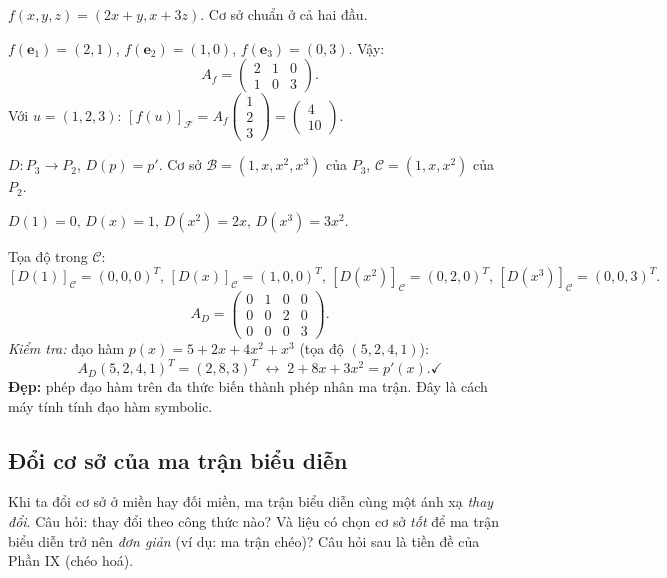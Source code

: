 \documentclass[12pt,a4paper]{article}
\begin{document}
\begin{vidu}[title={Áp dụng với $f: \mathbb{R}^3 \to \mathbb{R}^2$}]
$f(x, y, z) = (2x + y, x + 3z)$. Cơ sở chuẩn ở cả hai đầu.

$f(\mathbf{e}_1) = (2, 1)$, $f(\mathbf{e}_2) = (1, 0)$, $f(\mathbf{e}_3) = (0, 3)$. Vậy:
\[
  A_f = \begin{pmatrix}2 & 1 & 0\\ 1 & 0 & 3\end{pmatrix}.
\]
Với $u = (1, 2, 3)$: $[f(u)]_{\mathcal{F}} = A_f \begin{pmatrix}1\\2\\3\end{pmatrix} = \begin{pmatrix}4\\10\end{pmatrix}$.
\end{vidu}

\begin{vidu}[title={Đạo hàm trên đa thức -- ánh xạ tuyến tính trên KGVT phi-$\mathbb{R}^n$}]
$D: P_3 \to P_2$, $D(p) = p'$. Cơ sở $\mathcal{B} = (1, x, x^2, x^3)$ của $P_3$, $\mathcal{C} = (1, x, x^2)$ của $P_2$.

$D(1) = 0,\, D(x) = 1,\, D(x^2) = 2x,\, D(x^3) = 3x^2$.

Tọa độ trong $\mathcal{C}$:
\[
  [D(1)]_{\mathcal{C}} = (0,0,0)^T,\, [D(x)]_{\mathcal{C}} = (1,0,0)^T,\, [D(x^2)]_{\mathcal{C}} = (0,2,0)^T,\, [D(x^3)]_{\mathcal{C}} = (0,0,3)^T.
\]
\[
  A_D = \begin{pmatrix}0 & 1 & 0 & 0\\ 0 & 0 & 2 & 0\\ 0 & 0 & 0 & 3\end{pmatrix}.
\]
\emph{Kiểm tra:} đạo hàm $p(x) = 5 + 2x + 4x^2 + x^3$ (tọa độ $(5,2,4,1)$):
\[
  A_D (5,2,4,1)^T = (2, 8, 3)^T \;\leftrightarrow\; 2 + 8x + 3x^2 = p'(x). \checkmark
\]
\textbf{Đẹp:} phép đạo hàm trên đa thức biến thành phép nhân ma trận. Đây là cách máy tính tính đạo hàm symbolic.
\end{vidu}

\subsection{Đổi cơ sở của ma trận biểu diễn}

\begin{dongco}
Khi ta đổi cơ sở ở miền hay đối miền, ma trận biểu diễn cùng một ánh xạ \emph{thay đổi}. Câu hỏi: thay đổi theo công thức nào? Và liệu có chọn cơ sở \emph{tốt} để ma trận biểu diễn trở nên \emph{đơn giản} (ví dụ: ma trận chéo)? Câu hỏi sau là tiền đề của Phần IX (chéo hoá).
\end{dongco}
\end{document}
